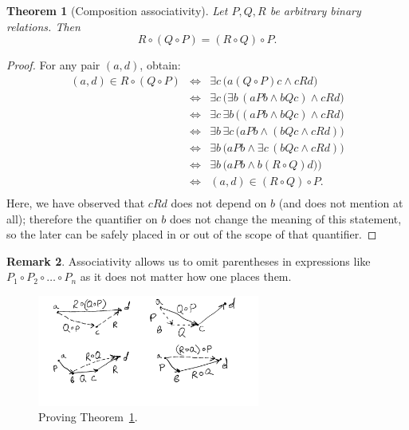 \documentclass[12pt,notitlepage]{article}
\theoremstyle{plain}
\newtheorem{thm}{Theorem}[section]
\theoremstyle{definition}
\newtheorem{rem}[thm]{Remark}
\theoremstyle{plain}
\newcommand{\1}{\mathbf{1}}
\newcommand{\0}{\mathbf{0}}
\newcommand{\mcomm}[1]{}
\begin{document}
\begin{thm}[Composition associativity]\label{ch0:rel_comp}
Let $P, Q, R$ be arbitrary binary relations. Then
$$R \circ (Q \circ P) = (R \circ Q) \circ P.$$
\end{thm}
\begin{proof} For any pair $(a,d)$, obtain:
$$
\begin{array}{rcl}
(a, d) \in R \circ (Q \circ P) &\iff& \exists c\, \bigl( a(Q \circ P)c \wedge cRd \bigr)\\
&\iff&\exists c\, \bigl( \exists b\, ( aPb \wedge bQc ) \wedge cRd \bigr)\\
&\iff& \exists c\, \exists b\, \bigl(  (aPb \wedge bQc)  \wedge cRd \bigr)\\
&\iff& \exists b\, \exists c\, \bigl(  aPb \wedge (bQc  \wedge cRd) \bigr)\\
&\iff&\exists b\, \bigl( aPb \wedge \exists c\, (bQc  \wedge cRd ) \bigr)\\
&\iff&\exists b\, \bigl( aPb \wedge b(R \circ Q)d ) \bigr)\\
&\iff& (a,d) \in (R \circ Q)\circ P.\\
\end{array}
$$
Here, we have observed that $c R d$ does not depend on $b$ (and does not mention at all); therefore the quantifier on $b$ does not change the meaning of this statement, so the later can be safely placed in or out of the scope of that quantifier.

\end{proof}
\mcomm{For this argument, the Instructor might wish to explain the logical equivalences $\exists x\, (A(x) \wedge B) \equiv \exists x\, A(x) \wedge B$ (where $B$ does not mention $x$) and $\exists x \exists y\, A \equiv \exists y \exists x\, A$ in more detail.}
\begin{rem}
Associativity allows us to omit parentheses in expressions like $P_1 \circ P_2 \circ \ldots \circ P_n$ as it does not matter how one places them.
\end{rem}

\begin{figure}[h]
\centering
\includegraphics*[width=0.65\textwidth]{comp_assoc.pdf}
\caption{Proving Theorem~\ref{ch0:rel_comp}.}
\end{figure}
\end{document}

